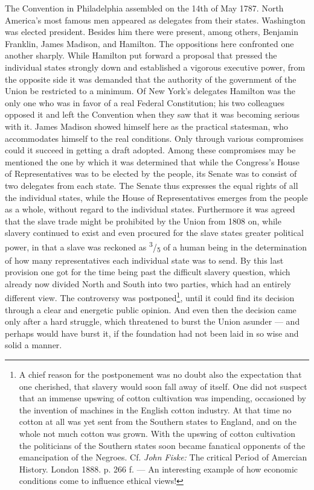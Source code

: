 \documentclass[12pt,a4paper,openany]{book}
\newcommand{\opage}[1]{\marginnote{\footnotesize\textit{[#1]}}}
\begin{document}
The Convention in Philadelphia assembled on the 14th of May 1787.
North America's most famous men appeared as delegates from
their states. Washington was elected president. Besides
\opage{130}him there were present, among others, Benjamin Franklin, James Madison, and Hamilton.
The oppositions here confronted one another sharply.
While Hamilton put forward a proposal that pressed the
individual states strongly down and established a vigorous executive
power, from the opposite side it was demanded that the authority of the
government of the Union be restricted to a minimum. Of New York's
delegates Hamilton was the only one who was in favor of a
real Federal Constitution; his two colleagues opposed it
and left the Convention when they saw that it was becoming serious
with it. James Madison showed himself here as the practical
statesman, who accommodates himself to the real conditions. Only through
various compromises could it succeed in getting a draft
adopted. Among these compromises may be mentioned the one by which
it was determined that while the Congress's House of Representatives was to
be elected by the people, its Senate was to consist of two delegates
from each state. The Senate thus expresses the equal rights
of all the individual states, while the House of Representatives emerges from the people
as a whole, without regard to the individual states. Furthermore
it was agreed that the slave trade might be prohibited by the Union
from 1808 on, while slavery continued to exist and even
procured for the slave states greater political power, in that a slave
was reckoned as \textsuperscript{3}/\textsubscript{5} of a human being in the determination of how many
representatives each individual state was to send. By this
last provision one got for the time being past the
difficult slavery question, which already now divided North and
South into two parties, which had an entirely different view.
The controversy was postponed\footnote{A chief reason for the postponement was no doubt also the expectation
that one cherished, that slavery would soon fall away of itself.
One did not suspect that an immense upswing of
cotton cultivation was impending, occasioned by the invention of machines in the English
cotton industry. At that time no cotton at all was yet sent
from the Southern states to England, and on the whole not much
cotton was grown. With the upswing of cotton cultivation the
politicians of the Southern states soon became fanatical opponents of the emancipation of the Negroes.
Cf. \emph{John Fiske:} The critical Period of Amercian History. %
London 1888. p. 266 f. --- An interesting example of how
economic conditions come to influence ethical views!}, until it could find its decision
through a clear and energetic public opinion. And even then
\opage{131}the decision came only after a hard struggle, which threatened
to burst the Union asunder --- and perhaps would have burst it, if
the foundation had not been laid in so wise and solid a manner.
\end{document}
